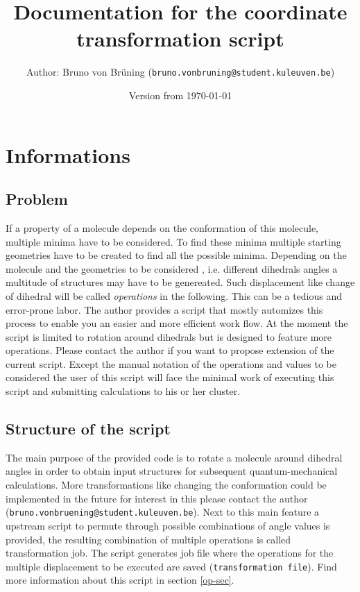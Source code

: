 \documentclass[parskip]{scrartcl}
\title{\Large Documentation for the coordinate transformation script}
\date{\normalsize Version from \today}
\author{\normalsize Author: Bruno von Brüning (\texttt{bruno.vonbruning@student.kuleuven.be})}
\begin{document}
\maketitle

\section{Informations}

    \subsection{Problem}
        If a property of a molecule depends on the conformation of this molecule, multiple
        minima have to be considered.
        To find these minima multiple starting geometries have to be created to find 
        all the possible minima. Depending on the molecule and the geometries to be considered
        , i.e. different dihedrals angles a multitude of structures may have to be genereated.
        Such displacement like change of dihedral will be called \textit{operations} in the
        following. 
        This can be a tedious and error-prone labor. The author provides a script that
        mostly automizes this process to enable you an easier and more efficient work flow.
        At the moment the script is limited to rotation around dihedrals but is designed to
        feature more operations. Please contact the author if you want to propose extension of
        the current script.
        Except the manual notation of the operations and values to be considered the user of
        this script will face the minimal work of executing this script and submitting
        calculations to his or her cluster.

    \subsection{Structure of the script}
        The main purpose of the provided code is to rotate a molecule around dihedral angles 
        in order to obtain input structures for subsequent quantum-mechanical calculations.
        More transformations like changing the conformation could be implemented in the future
        for interest in this please contact the author
        (\texttt{bruno.vonbruening@student.kuleuven.be}).
        Next to this main feature a upstream script to permute through possible combinations 
        of angle values is provided, the resulting combination of multiple operations is
        called transformation job. The script generates job file where the operations for the
        multiple displacement to be executed are saved (\texttt{transformation file}). 
        Find more information about this script in section \ref{op-sec}.
\end{document}
